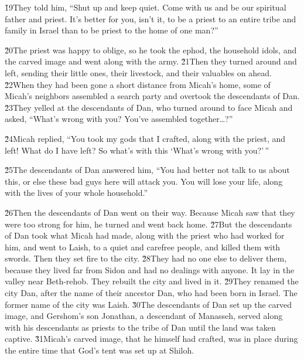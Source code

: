 \v{19}They told him, ``Shut up and keep quiet. Come with us and be our spiritual father and priest. It's better for you, isn't it, to be a priest to an entire tribe and family in Israel than to be priest to the home of one man?''

\v{20}The priest was happy to oblige, so he took the ephod, the household idols, and the carved image and went along with the army. \v{21}Then they turned around and left, sending their little ones, their livestock, and their valuables on ahead. \v{22}When they had been gone a short distance from Micah's home, some of Micah's neighbors assembled a search party and overtook the descendants of Dan. \v{23}They yelled at the descendants of Dan, who turned around to face Micah and asked, ``What's wrong with you? You've assembled together{\ldots}?''

\v{24}Micah replied, ``You took my gods that I crafted, along with the priest, and left! What do I have left? So what's with this `What's wrong with you?'\,''

\v{25}The descendants of Dan answered him, ``You had better not talk to us about this, or else these bad guys here will attack you. You will lose your life, along with the lives of your whole household.''

\v{26}Then the descendants of Dan went on their way. Because Micah saw that they were too strong for him, he turned and went back home. \v{27}But the descendants of Dan took what Micah had made, along with the priest who had worked for him, and went to Laish, to a quiet and carefree people, and killed them with swords. Then they set fire to the city. \v{28}They had no one else to deliver them, because they lived far from Sidon and had no dealings with anyone. It lay in the valley near Beth-rehob. They rebuilt the city and lived in it. \v{29}They renamed the city Dan, after the name of their ancestor Dan, who had been born in Israel. The former name of the city was Laish. \v{30}The descendants of Dan set up the carved image, and Gershom's son Jonathan, a descendant of Manasseh, served along with his descendants as priests to the tribe of Dan until the land was taken captive. \v{31}Micah's carved image, that he himself had crafted, was in place during the entire time that God's tent was set up at Shiloh.

